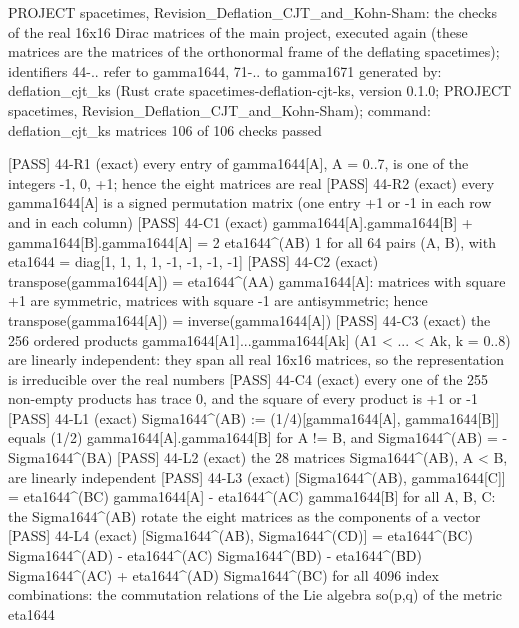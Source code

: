 \documentclass[
  10pt,
]{article}
\newenvironment{Shaded}{}{}
\newcommand{\NormalTok}[1]{#1}
\begin{document}
\begin{Shaded}
\begin{Highlighting}[]
\NormalTok{PROJECT spacetimes, Revision\_Deflation\_CJT\_and\_Kohn{-}Sham: the checks of the real 16x16 Dirac matrices of the main project, executed again (these matrices are the matrices of the orthonormal frame of the deflating spacetimes); identifiers 44{-}.. refer to gamma1644, 71{-}.. to gamma1671}
\NormalTok{generated by: deflation\_cjt\_ks (Rust crate spacetimes{-}deflation{-}cjt{-}ks, version 0.1.0; PROJECT spacetimes, Revision\_Deflation\_CJT\_and\_Kohn{-}Sham); command: deflation\_cjt\_ks matrices}
\NormalTok{106 of 106 checks passed}

\NormalTok{[PASS] 44{-}R1  (exact) every entry of gamma1644[A], A = 0..7, is one of the integers {-}1, 0, +1; hence the eight matrices are real}
\NormalTok{[PASS] 44{-}R2  (exact) every gamma1644[A] is a signed permutation matrix (one entry +1 or {-}1 in each row and in each column)}
\NormalTok{[PASS] 44{-}C1  (exact) gamma1644[A].gamma1644[B] + gamma1644[B].gamma1644[A] = 2 eta1644\^{}(AB) 1 for all 64 pairs (A, B), with eta1644 = diag[1, 1, 1, 1, {-}1, {-}1, {-}1, {-}1]}
\NormalTok{[PASS] 44{-}C2  (exact) transpose(gamma1644[A]) = eta1644\^{}(AA) gamma1644[A]: matrices with square +1 are symmetric, matrices with square {-}1 are antisymmetric; hence transpose(gamma1644[A]) = inverse(gamma1644[A])}
\NormalTok{[PASS] 44{-}C3  (exact) the 256 ordered products gamma1644[A1]...gamma1644[Ak] (A1 \textless{} ... \textless{} Ak, k = 0..8) are linearly independent: they span all real 16x16 matrices, so the representation is irreducible over the real numbers}
\NormalTok{[PASS] 44{-}C4  (exact) every one of the 255 non{-}empty products has trace 0, and the square of every product is +1 or {-}1}
\NormalTok{[PASS] 44{-}L1  (exact) Sigma1644\^{}(AB) := (1/4)[gamma1644[A], gamma1644[B]] equals (1/2) gamma1644[A].gamma1644[B] for A != B, and Sigma1644\^{}(AB) = {-}Sigma1644\^{}(BA)}
\NormalTok{[PASS] 44{-}L2  (exact) the 28 matrices Sigma1644\^{}(AB), A \textless{} B, are linearly independent}
\NormalTok{[PASS] 44{-}L3  (exact) [Sigma1644\^{}(AB), gamma1644[C]] = eta1644\^{}(BC) gamma1644[A] {-} eta1644\^{}(AC) gamma1644[B] for all A, B, C: the Sigma1644\^{}(AB) rotate the eight matrices as the components of a vector}
\NormalTok{[PASS] 44{-}L4  (exact) [Sigma1644\^{}(AB), Sigma1644\^{}(CD)] = eta1644\^{}(BC) Sigma1644\^{}(AD) {-} eta1644\^{}(AC) Sigma1644\^{}(BD) {-} eta1644\^{}(BD) Sigma1644\^{}(AC) + eta1644\^{}(AD) Sigma1644\^{}(BC) for all 4096 index combinations: the commutation relations of the Lie algebra so(p,q) of the metric eta1644}

\end{Highlighting}
\end{Shaded}
\end{document}
